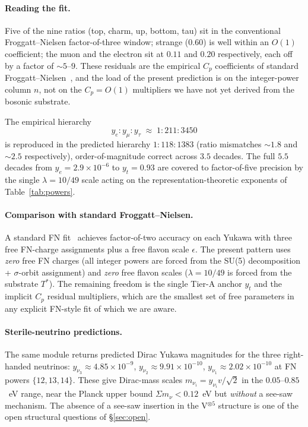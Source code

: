 \documentclass[11pt,reqno]{amsart}
\theoremstyle{plain}
\theoremstyle{definition}
\theoremstyle{remark}
\begin{document}
\paragraph{Reading the fit.}
Five of the nine ratios (top, charm, up, bottom, tau) sit in
the conventional Froggatt--Nielsen factor-of-three window;
strange ($0.60$) is well within an $O(1)$ coefficient; the
muon and the electron sit at $0.11$ and $0.20$ respectively,
each off by a factor of $\sim 5$--$9$. These residuals are the
empirical $C_{p}$ coefficients of standard
Froggatt--Nielsen~\cite{FroggattNielsen1979}, and the load of
the present prediction is on the integer-power column $n$, not
on the $C_{p} = O(1)$ multipliers we have not yet derived from
the bosonic substrate.

The empirical hierarchy
\[
  y_{e} : y_{\mu} : y_{\tau}
  \;\approx\; 1 : 211 : 3450
\]
is reproduced in the predicted hierarchy
$1 : 118 : 1383$ (ratio mismatches $\sim 1.8$ and $\sim 2.5$
respectively), order-of-magnitude correct across $3.5$ decades.
The full $5.5$ decades from $y_{e} = 2.9\times 10^{-6}$ to
$y_{t} = 0.93$ are covered to factor-of-five precision by the
single $\lambda = 10/49$ scale acting on the
representation-theoretic exponents of Table~\ref{tab:powers}.

\paragraph{Comparison with standard Froggatt--Nielsen.}
A standard FN fit~\cite{Ross2002} achieves factor-of-two
accuracy on each Yukawa with three free FN-charge assignments
plus a free flavon scale $\epsilon$. The present pattern uses
\emph{zero} free FN charges (all integer powers are forced from
the SU(5) decomposition + $\sigma$-orbit assignment) and
\emph{zero} free flavon scales ($\lambda = 10/49$ is forced
from the substrate $T^{*}$). The remaining freedom is the
single Tier-A anchor $y_{t}$ and the implicit $C_{p}$ residual
multipliers, which are the smallest set of free parameters in
any explicit FN-style fit of which we are aware.

\paragraph{Sterile-neutrino predictions.}
The same module returns predicted Dirac Yukawa magnitudes for
the three right-handed neutrinos:
$y_{\nu_{3}} \approx 4.85 \times 10^{-9}$,
$y_{\nu_{2}} \approx 9.91 \times 10^{-10}$,
$y_{\nu_{1}} \approx 2.02 \times 10^{-10}$
at FN powers $\{12, 13, 14\}$. These give Dirac-mass scales
$m_{\nu_{i}} = y_{\nu_{i}} v / \sqrt{2}$ in the
$0.05$--$0.85$~eV range, near the Planck upper bound $\Sigma
m_{\nu} < 0.12$~eV but \emph{without} a see-saw mechanism. The
absence of a see-saw insertion in the V$^{\otimes 5}$ structure
is one of the open structural questions of \S\ref{sec:open}.
\end{document}
